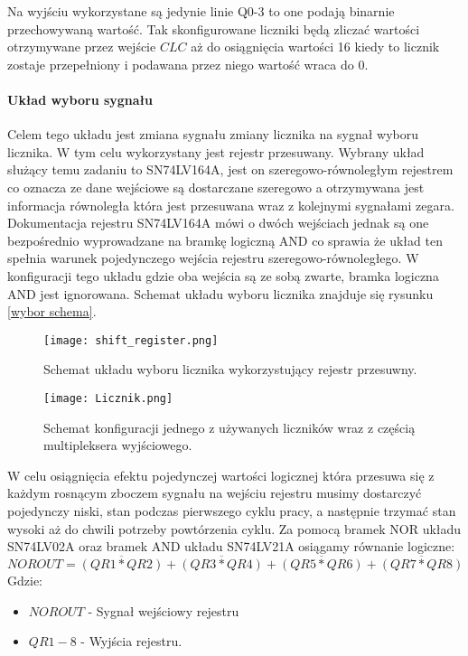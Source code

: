 Na wyjściu wykorzystane są jedynie linie Q0-3 to one podają binarnie przechowywaną wartość. 
Tak skonfigurowane liczniki będą zliczać wartości otrzymywane przez wejście $CLC$ aż do osiągnięcia wartości 16 kiedy to licznik zostaje przepełniony i podawana przez niego wartość wraca do 0. 

\paragraph{Układ wyboru sygnału}

Celem tego układu jest zmiana sygnału zmiany licznika na sygnał wyboru licznika. W tym celu wykorzystany jest rejestr przesuwany. 
Wybrany układ służący temu zadaniu to SN74LV164A\cite{shift doc}, jest on szeregowo-równoległym rejestrem co oznacza ze dane wejściowe są dostarczane szeregowo a otrzymywana jest informacja równoległa która jest przesuwana wraz z kolejnymi sygnałami zegara. Dokumentacja rejestru SN74LV164A mówi o dwóch wejściach jednak są one bezpośrednio wyprowadzane na bramkę logiczną AND co sprawia że układ ten spełnia warunek pojedynczego wejścia rejestru szeregowo-równoległego. W konfiguracji tego układu gdzie oba wejścia są ze sobą zwarte, bramka logiczna AND jest ignorowana.
Schemat układu wyboru licznika znajduje się rysunku \ref{wybor schema}. 

\begin{figure}
        \begin{multicols}{2}
                \texttt{[image: shift\_register.png]}
                \caption{Schemat układu wyboru licznika wykorzystujący rejestr przesuwny.}
                \label{wybor schema}
                \par
                \hfill
                \texttt{[image: Licznik.png]}
                \caption{Schemat konfiguracji jednego z używanych liczników wraz z częścią multipleksera wyjściowego.}
                \label{licznik}
                \par
                \hfill
        \end{multicols} 
\end{figure}

W celu osiągnięcia efektu pojedynczej wartości logicznej która przesuwa się z każdym rosnącym zboczem sygnału na wejściu rejestru musimy dostarczyć pojedynczy niski, stan podczas pierwszego cyklu pracy, a następnie trzymać stan wysoki aż do chwili potrzeby powtórzenia cyklu. 
Za pomocą bramek NOR układu SN74LV02A oraz bramek AND układu SN74LV21A osiągamy równanie logiczne:
\begin{equation}
        NOROUT = \overline{(QR1*QR2)} + \overline{(QR3*QR4)} + \overline{(QR5*QR6)} + \overline{(QR7*QR8)}
\end{equation}
Gdzie:
\begin{itemize}
        \item $NOROUT$ - Sygnał wejściowy rejestru 
        \item $QR1-8$ - Wyjścia rejestru. 
\end{itemize}

